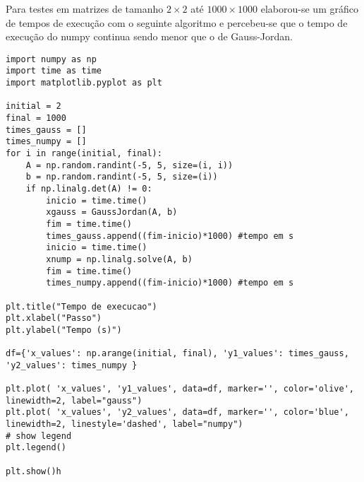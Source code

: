 Para testes em matrizes de tamanho $2 \times 2$ até $1000 \times 1000$ elaborou-se um gráfico de tempos de execução com o seguinte algoritmo e percebeu-se que o tempo de execução do numpy continua sendo menor que o de Gauss-Jordan.\\


\begin{lstlisting}
import numpy as np
import time as time
import matplotlib.pyplot as plt

initial = 2
final = 1000
times_gauss = []
times_numpy = []
for i in range(initial, final):
    A = np.random.randint(-5, 5, size=(i, i))
    b = np.random.randint(-5, 5, size=(i))
    if np.linalg.det(A) != 0:
        inicio = time.time()
        xgauss = GaussJordan(A, b)
        fim = time.time()
        times_gauss.append((fim-inicio)*1000) #tempo em s
        inicio = time.time()
        xnump = np.linalg.solve(A, b)
        fim = time.time()  
        times_numpy.append((fim-inicio)*1000) #tempo em s

plt.title("Tempo de execucao")
plt.xlabel("Passo")
plt.ylabel("Tempo (s)")

df={'x_values': np.arange(initial, final), 'y1_values': times_gauss, 
'y2_values': times_numpy }
 
plt.plot( 'x_values', 'y1_values', data=df, marker='', color='olive',
linewidth=2, label="gauss")
plt.plot( 'x_values', 'y2_values', data=df, marker='', color='blue', 
linewidth=2, linestyle='dashed', label="numpy")
# show legend
plt.legend()

plt.show()h
\end{lstlisting}